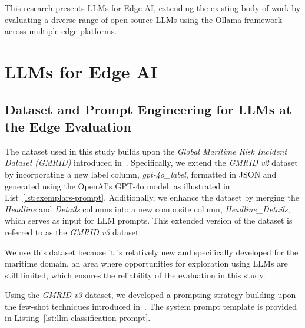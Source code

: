 \documentclass[conference]{IEEEtran}
\begin{document}

This research presents LLMs for Edge AI, extending the existing body of work by evaluating a diverse range of open-source LLMs using the Ollama framework across multiple edge platforms.

\section{%
LLMs for Edge AI}

\subsection{Dataset and Prompt Engineering for LLMs at the Edge Evaluation}

The dataset used in this study builds upon the \textit{Global Maritime Risk Incident Dataset (GMRID)} introduced in~\cite{huang2024automating}. Specifically, we extend the \textit{GMRID v2} dataset by incorporating a new label column, \textit{gpt-4o\_label}, formatted in JSON and generated using the OpenAI's GPT-4o model, as illustrated in List~\ref{lst:exemplars-prompt}. Additionally, we enhance the dataset by merging the \textit{Headline} and \textit{Details} columns into a new composite column, \textit{Headline\_Details}, which serves as input for LLM prompts. This extended version of the dataset is referred to as the \textit{GMRID v3} dataset.

We use this dataset because it is relatively new and specifically developed for the maritime domain, an area where opportunities for exploration using LLMs are still limited, which ensures the reliability of the evaluation in this study.

Using the \textit{GMRID v3} dataset, we developed a prompting strategy building upon the few-shot techniques introduced in~\cite{huang2024automating}. 
The system prompt template is provided in Listing~\ref{lst:llm-classification-prompt}.
\end{document}
